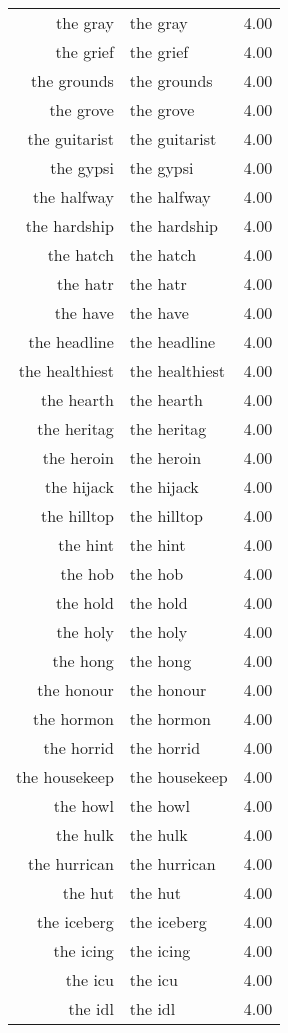 \begin{table}[ht]
\begin{tabular}{rlr}
  the gray & the gray & 4.00 \\ 
  the grief & the grief & 4.00 \\ 
  the grounds & the grounds & 4.00 \\ 
  the grove & the grove & 4.00 \\ 
  the guitarist & the guitarist & 4.00 \\ 
  the gypsi & the gypsi & 4.00 \\ 
  the halfway & the halfway & 4.00 \\ 
  the hardship & the hardship & 4.00 \\ 
  the hatch & the hatch & 4.00 \\ 
  the hatr & the hatr & 4.00 \\ 
  the have & the have & 4.00 \\ 
  the headline & the headline & 4.00 \\ 
  the healthiest & the healthiest & 4.00 \\ 
  the hearth & the hearth & 4.00 \\ 
  the heritag & the heritag & 4.00 \\ 
  the heroin & the heroin & 4.00 \\ 
  the hijack & the hijack & 4.00 \\ 
  the hilltop & the hilltop & 4.00 \\ 
  the hint & the hint & 4.00 \\ 
  the hob & the hob & 4.00 \\ 
  the hold & the hold & 4.00 \\ 
  the holy & the holy & 4.00 \\ 
  the hong & the hong & 4.00 \\ 
  the honour & the honour & 4.00 \\ 
  the hormon & the hormon & 4.00 \\ 
  the horrid & the horrid & 4.00 \\ 
  the housekeep & the housekeep & 4.00 \\ 
  the howl & the howl & 4.00 \\ 
  the hulk & the hulk & 4.00 \\ 
  the hurrican & the hurrican & 4.00 \\ 
  the hut & the hut & 4.00 \\ 
  the iceberg & the iceberg & 4.00 \\ 
  the icing & the icing & 4.00 \\ 
  the icu & the icu & 4.00 \\ 
  the idl & the idl & 4.00 \\ 

\end{tabular}
\end{table}
